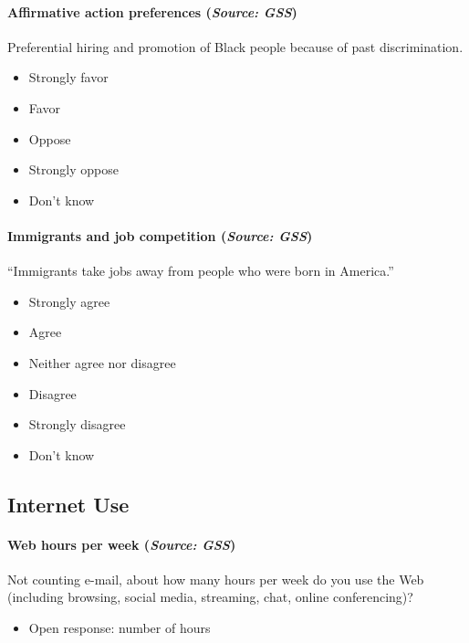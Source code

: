 \documentclass[letterpaper,12pt]{article}
\theoremstyle{proposition}
\begin{document}
\paragraph{Affirmative action preferences (\textit{Source: GSS})}
Preferential hiring and promotion of Black people because of past discrimination.
\begin{itemize}[itemsep=-10pt,topsep=0pt]
\item Strongly favor
\item Favor
\item Oppose
\item Strongly oppose
\item Don’t know
\end{itemize}

\paragraph{Immigrants and job competition (\textit{Source: GSS})}
“Immigrants take jobs away from people who were born in America.”
\begin{itemize}[itemsep=-10pt,topsep=0pt]
\item Strongly agree
\item Agree
\item Neither agree nor disagree
\item Disagree
\item Strongly disagree
\item Don’t know
\end{itemize}


\subsection*{Internet Use}

\paragraph{Web hours per week (\textit{Source: GSS})}
Not counting e-mail, about how many hours per week do you use the Web (including browsing, social media, streaming, chat, online conferencing)?
\begin{itemize}[itemsep=-10pt,topsep=0pt]
\item Open response: number of hours
\end{itemize}
\end{document}
